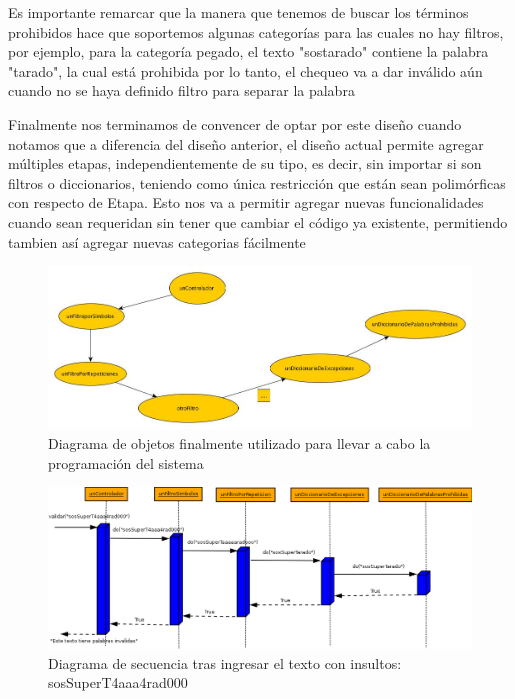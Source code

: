 Es importante remarcar que la manera que tenemos de buscar los términos prohibidos hace que soportemos algunas categorías para las cuales no hay filtros, por ejemplo, para la categoría pegado, el texto "sostarado" contiene la palabra "tarado", la cual está prohibida por lo tanto, el chequeo va a dar inválido aún cuando no se haya definido filtro para separar la palabra

Finalmente nos terminamos de convencer de optar por este diseño cuando notamos que a diferencia del diseño anterior, el diseño actual permite agregar múltiples etapas, independientemente de su tipo, es decir, sin importar si son filtros o diccionarios, teniendo como única restricción que están sean polimórficas con respecto de Etapa. Esto nos va a permitir agregar nuevas funcionalidades cuando sean requeridan sin tener que cambiar el código ya existente, permitiendo tambien así agregar nuevas categorias fácilmente

\begin{figure}[H]
\centering
\includegraphics[scale=0.4]{../../img/disenoFinal.jpg}
\caption{Diagrama de objetos finalmente utilizado para llevar a cabo la programación del sistema}
\end{figure}

\begin{figure}[H]
\centering
\includegraphics[scale=0.35]{../../img/sosSuperTarado.png}
\caption{Diagrama de secuencia tras ingresar el texto con insultos: sosSuperT4aaa4rad000}
\end{figure}

